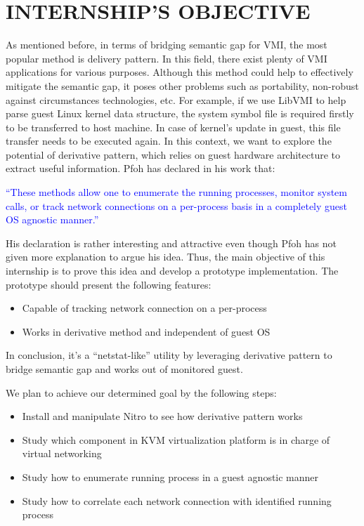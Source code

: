 
\chapter{INTERNSHIP’S OBJECTIVE} %

\label{Chapter3} %


As mentioned before, in terms of bridging semantic gap for VMI, the most popular method is delivery pattern. In this field, there 
exist plenty of VMI applications for various purposes. Although this method could help to effectively mitigate the semantic gap, it poses other 
problems such as portability, non-robust against circumstances technologies, etc. For example, if we use LibVMI to help parse guest Linux kernel
data structure, the system symbol file is required firstly to be transferred to host machine. In case of kernel’s update in guest, this file 
transfer needs to be executed again. In this context, we want to explore the potential of derivative pattern, which relies on guest hardware 
architecture to extract useful information. Pfoh has declared in his work \cite{Reference7} that:

\textcolor{blue}{
  “These methods allow one to enumerate the running processes, monitor system calls, or track network connections 
  on a per-process basis in a completely guest OS agnostic manner.” 
}

His declaration is rather interesting and attractive even though Pfoh has not given more explanation to argue his idea. Thus, the main 
objective of this internship is to prove this idea and develop a prototype implementation. The prototype should present the following features:

\begin{itemize}
    \item Capable of tracking network connection on a per-process
    \item Works in derivative method and independent of guest OS
 \end{itemize}

In conclusion, it’s a “netstat-like” utility by leveraging derivative pattern to bridge semantic gap and works out of monitored guest.

We plan to achieve our determined goal by the following steps:

\begin{itemize}
    \item Install and manipulate Nitro to see how derivative pattern works
    \item Study which component in KVM virtualization platform is in charge of virtual networking
    \item Study how to enumerate running process in a guest agnostic manner
    \item Study how to correlate each network connection with identified running process 
 \end{itemize}
